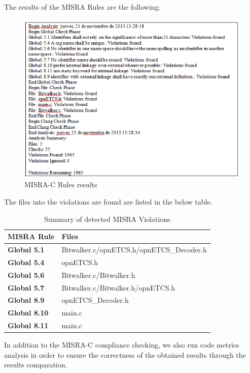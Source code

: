 The results of the MISRA Rules are the following:
\begin{figure}[H]
\centering
\includegraphics{./figures/understand.png}
\caption{MISRA-C Rules results}
\end{figure}

The files into the violations are found are listed in the below table.

{\footnotesize\sffamily\centering
  \begin{longtable}{||p{}|p{}||}
  \caption{Summary of detected MISRA Violations}\\
    \hline\hline
    \textbf{MISRA Rule} & \textbf{Files} \\
    \hline\hline
    \endhead
    \hline\hline
    \endfoot
    \textbf{Global 5.1}
& Bitwalker.c/opnETCS.h/opnETCS\_Decoder.h
    \\
    \hline
    \textbf{Global 5.4}
& opnETCS.h
    \\
    \hline
    \textbf{Global 5.6}
& Bitwalker.c/Bitwalker.h
    \\
    \hline
    \textbf{Global 5.7}
& Bitwalker.c/Bitwalker.h/opnETCS.h
    \\
    \hline
    \textbf{Global 8.9}
& opnETCS\_Decoder.h
    \\
    \hline
    \textbf{Global 8.10}
& main.c
    \\
    \hline
    \textbf{Global 8.11}
& main.c
    \\
    \hline
\end{longtable}}

In addition to the MISRA-C compliance checking, we also run code metrics analysis in order to ensure the correctness of the obtained results through the results comparation.

